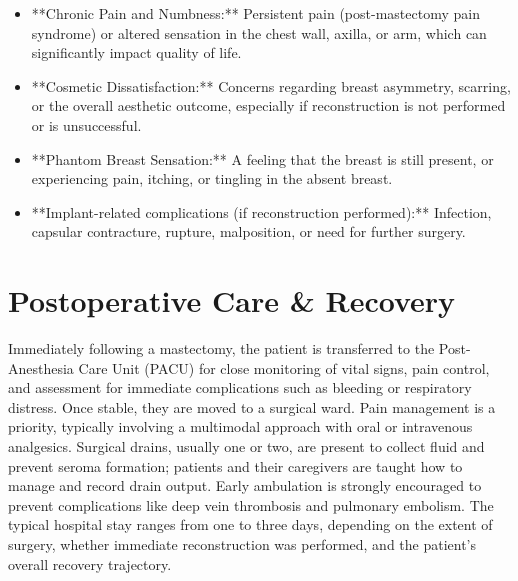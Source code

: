 \begin{itemize}
\begin{itemize}
\begin{itemize}
          \item **Long thoracic nerve:** Injury results in "winged scapula" due to paralysis of the serratus anterior muscle.
          \item **Thoracodorsal nerve:** Injury causes weakness of the latissimus dorsi muscle.
          \item **Medial/Lateral pectoral nerves:** Injury can lead to atrophy of the pectoralis muscles.
        \end{itemize}
      \item **Chronic Pain and Numbness:** Persistent pain (post-mastectomy pain syndrome) or altered sensation in the chest wall, axilla, or arm, which can significantly impact quality of life.
      \item **Cosmetic Dissatisfaction:** Concerns regarding breast asymmetry, scarring, or the overall aesthetic outcome, especially if reconstruction is not performed or is unsuccessful.
      \item **Phantom Breast Sensation:** A feeling that the breast is still present, or experiencing pain, itching, or tingling in the absent breast.
      \item **Implant-related complications (if reconstruction performed):** Infection, capsular contracture, rupture, malposition, or need for further surgery.
    \end{itemize}
\end{itemize}

\section*{Postoperative Care \& Recovery}
Immediately following a mastectomy, the patient is transferred to the Post-Anesthesia Care Unit (PACU) for close monitoring of vital signs, pain control, and assessment for immediate complications such as bleeding or respiratory distress. Once stable, they are moved to a surgical ward. Pain management is a priority, typically involving a multimodal approach with oral or intravenous analgesics. Surgical drains, usually one or two, are present to collect fluid and prevent seroma formation; patients and their caregivers are taught how to manage and record drain output. Early ambulation is strongly encouraged to prevent complications like deep vein thrombosis and pulmonary embolism. The typical hospital stay ranges from one to three days, depending on the extent of surgery, whether immediate reconstruction was performed, and the patient's overall recovery trajectory.

